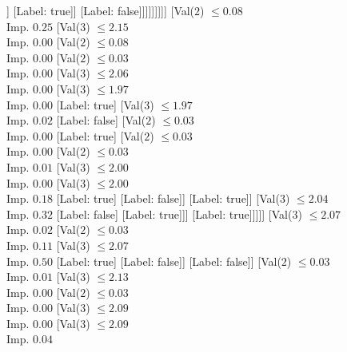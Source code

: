 \documentclass[margin=10pt]{standalone}
\begin{document}
\begin{forest}
								[Label: true]
								[Val($3$) $ \leq 2.86$ \\ Imp. $0.15$
									[Label: false]
									[Val($3$) $ \leq 2.89$ \\ Imp. $0.18$
										[Val($3$) $ \leq 2.86$ \\ Imp. $0.12$
											[Val($3$) $ \leq 2.86$ \\ Imp. $0.50$
												[Label: true]
												[Label: false]]
											[Label: true]]
										[Label: false]]]]]]]]]
		[Val($2$) $ \leq 0.08$ \\ Imp. $0.25$
			[Val($3$) $ \leq 2.15$ \\ Imp. $0.00$
				[Val($2$) $ \leq 0.08$ \\ Imp. $0.00$
					[Val($2$) $ \leq 0.03$ \\ Imp. $0.00$
						[Val($3$) $ \leq 2.06$ \\ Imp. $0.00$
							[Val($3$) $ \leq 1.97$ \\ Imp. $0.00$
								[Label: true]
								[Val($3$) $ \leq 1.97$ \\ Imp. $0.02$
									[Label: false]
									[Val($2$) $ \leq 0.03$ \\ Imp. $0.00$
										[Label: true]
										[Val($2$) $ \leq 0.03$ \\ Imp. $0.00$
											[Val($2$) $ \leq 0.03$ \\ Imp. $0.01$
												[Val($3$) $ \leq 2.00$ \\ Imp. $0.00$
													[Val($3$) $ \leq 2.00$ \\ Imp. $0.18$
														[Label: true]
														[Label: false]]
													[Label: true]]
												[Val($3$) $ \leq 2.04$ \\ Imp. $0.32$
													[Label: false]
													[Label: true]]]
											[Label: true]]]]]
							[Val($3$) $ \leq 2.07$ \\ Imp. $0.02$
								[Val($2$) $ \leq 0.03$ \\ Imp. $0.11$
									[Val($3$) $ \leq 2.07$ \\ Imp. $0.50$
										[Label: true]
										[Label: false]]
									[Label: false]]
								[Val($2$) $ \leq 0.03$ \\ Imp. $0.01$
									[Val($3$) $ \leq 2.13$ \\ Imp. $0.00$
										[Val($2$) $ \leq 0.03$ \\ Imp. $0.00$
											[Val($3$) $ \leq 2.09$ \\ Imp. $0.00$
												[Val($3$) $ \leq 2.09$ \\ Imp. $0.04$

\end{forest}
\end{document}

